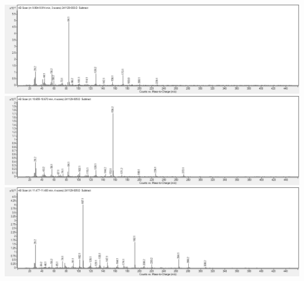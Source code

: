 \includegraphics[width=1\linewidth]{graphics/data/MS/09909.png}
\includegraphics[width=1\linewidth]{graphics/data/MS/10665.png}
\includegraphics[width=1\linewidth]{graphics/data/MS/11482.png}
